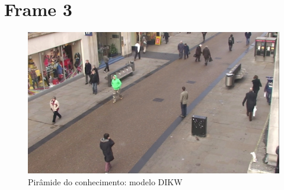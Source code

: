 \newpage
\section{Frame 3}


\begin{figure}[h]
	\centering
	\includegraphics[width=0.5\linewidth]{img/vision/frame3.png}
	\caption{Pirâmide do conhecimento: modelo DIKW}
	\label{db}
\end{figure}




